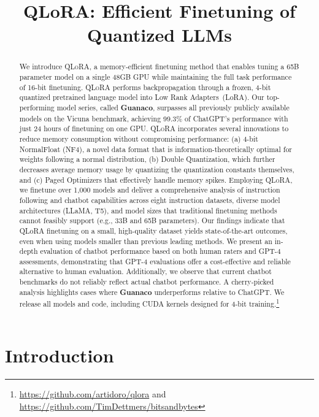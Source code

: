 \title{QLoRA: Efficient Finetuning of Quantized LLMs}

\begin{abstract}
We introduce \textsc{QLoRA}, a memory-efficient finetuning method that enables tuning a 65B parameter model on a single 48GB GPU while maintaining the full task performance of 16-bit finetuning. \textsc{QLoRA} performs backpropagation through a frozen, 4-bit quantized pretrained language model into Low Rank Adapters~(LoRA). Our top-performing model series, called \textbf{Guanaco}, surpasses all previously publicly available models on the Vicuna benchmark, achieving 99.3\% of ChatGPT's performance with just 24 hours of finetuning on one GPU. \textsc{QLoRA} incorporates several innovations to reduce memory consumption without compromising performance: (a) 4-bit NormalFloat (NF4), a novel data format that is information-theoretically optimal for weights following a normal distribution, (b) Double Quantization, which further decreases average memory usage by quantizing the quantization constants themselves, and (c) Paged Optimizers that effectively handle memory spikes. Employing \textsc{QLoRA}, we finetune over 1,000 models and deliver a comprehensive analysis of instruction following and chatbot capabilities across eight instruction datasets, diverse model architectures (LLaMA, T5), and model sizes that traditional finetuning methods cannot feasibly support (e.g., 33B and 65B parameters). Our findings indicate that QLoRA finetuning on a small, high-quality dataset yields state-of-the-art outcomes, even when using models smaller than previous leading methods. We present an in-depth evaluation of chatbot performance based on both human raters and GPT-4 assessments, demonstrating that GPT-4 evaluations offer a cost-effective and reliable alternative to human evaluation. Additionally, we observe that current chatbot benchmarks do not reliably reflect actual chatbot performance. A cherry-picked analysis highlights cases where \textbf{Guanaco} underperforms relative to ChatGPT. We release all models and code, including CUDA kernels designed for 4-bit training.\footnote{\url{https://github.com/artidoro/qlora} and \url{https://github.com/TimDettmers/bitsandbytes}}
\end{abstract}

\section{Introduction}

